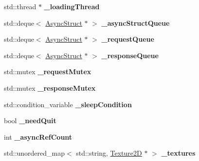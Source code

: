 \begin{DoxyCompactItemize}
\item 
\mbox{\label{classTextureCache_aea1f31816298888a7eefdf42d7919432}} 
std\+::thread $\ast$ {\bfseries \+\_\+loading\+Thread}
\item 
\mbox{\label{classTextureCache_a4752665f2610093e710de5296217e613}} 
std\+::deque$<$ \hyperlink{structTextureCache_1_1AsyncStruct}{Async\+Struct} $\ast$ $>$ {\bfseries \+\_\+async\+Struct\+Queue}
\item 
\mbox{\label{classTextureCache_a14ef80c78dee3ef26138317d8395060c}} 
std\+::deque$<$ \hyperlink{structTextureCache_1_1AsyncStruct}{Async\+Struct} $\ast$ $>$ {\bfseries \+\_\+request\+Queue}
\item 
\mbox{\label{classTextureCache_a7f5bc5e852856e5c2762ff17dba9c3cb}} 
std\+::deque$<$ \hyperlink{structTextureCache_1_1AsyncStruct}{Async\+Struct} $\ast$ $>$ {\bfseries \+\_\+response\+Queue}
\item 
\mbox{\label{classTextureCache_a11d20bdcc9a52e6be22fc54ceafbb812}} 
std\+::mutex {\bfseries \+\_\+request\+Mutex}
\item 
\mbox{\label{classTextureCache_a4d492edf8421f9ecf58e25d932e79116}} 
std\+::mutex {\bfseries \+\_\+response\+Mutex}
\item 
\mbox{\label{classTextureCache_a538bd77f97be3ad8286d91f159da4fd9}} 
std\+::condition\+\_\+variable {\bfseries \+\_\+sleep\+Condition}
\item 
\mbox{\label{classTextureCache_ae77a610b43e55879fce685ad98f03a37}} 
bool {\bfseries \+\_\+need\+Quit}
\item 
\mbox{\label{classTextureCache_af55a60b971c03ac5d46713cd53e39e4a}} 
int {\bfseries \+\_\+async\+Ref\+Count}
\item 
\mbox{\label{classTextureCache_a3b65419f3cbcd4a18a1ebbc26dfc66de}} 
std\+::unordered\+\_\+map$<$ std\+::string, \hyperlink{classTexture2D}{Texture2D} $\ast$ $>$ {\bfseries \+\_\+textures}
\end{DoxyCompactItemize}
